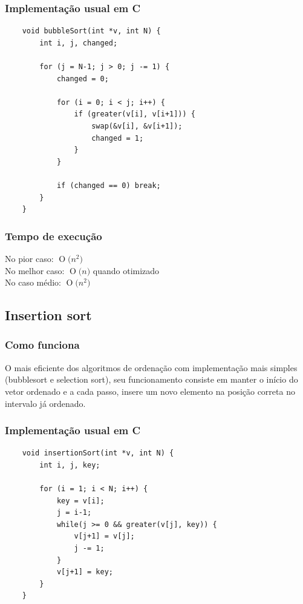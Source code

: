 \documentclass[12pt,a4paper]{article}
\newcommand{\BigO}[1]{\ensuremath{\operatorname{O}\bigl(#1\bigr)}}
\begin{document}
	\subsubsection{Implementação usual em C}
	\begin{minipage}{\linewidth}
	\begin{lstlisting}
	void bubbleSort(int *v, int N) {
		int i, j, changed;

		for (j = N-1; j > 0; j -= 1) {
			changed = 0;

			for (i = 0; i < j; i++) {
				if (greater(v[i], v[i+1])) {
					swap(&v[i], &v[i+1]);
					changed = 1;
				}
			}

			if (changed == 0) break;
		}
	}
	\end{lstlisting}
	\end{minipage}

	\subsubsection{Tempo de execução}
	\indent No pior caso: \BigO{n^2}\\
	\indent No melhor caso: \BigO{n} quando otimizado\\
	\indent No caso médio: \BigO{n^2}



	\subsection{Insertion sort}

	\subsubsection{Como funciona}
	\indent O mais eficiente dos algoritmos de ordenação com implementação mais simples (bubblesort e selection sort), seu funcionamento consiste em manter o início do vetor ordenado e a cada passo, insere um novo elemento na posição correta no intervalo já ordenado.

	\subsubsection{Implementação usual em C}
	\begin{minipage}{\linewidth}
	\begin{lstlisting}
	void insertionSort(int *v, int N) {
		int i, j, key;

		for (i = 1; i < N; i++) {
			key = v[i];
			j = i-1;
			while(j >= 0 && greater(v[j], key)) {
				v[j+1] = v[j];
				j -= 1;
			}
			v[j+1] = key;
		}
	}
	\end{lstlisting}
	\end{minipage}
\end{document}
